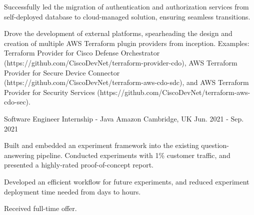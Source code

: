 \begin{cventries}
{\begin{cvitems}
        \item {Successfully led the migration of authentication and authorization services from self-deployed database to cloud-managed solution, ensuring seamless transitions.}
        \item {Drove the development of external platforms, spearheading the design and creation of multiple AWS Terraform plugin providers from inception. Examples: Terraform Provider for Cisco Defense Orchestrator (https://github.com/CiscoDevNet/terraform-provider-cdo), AWS Terraform Provider for Secure Device Connector (https://github.com/CiscoDevNet/terraform-aws-cdo-sdc), and AWS Terraform Provider for Security Services (https://github.com/CiscoDevNet/terraform-aws-cdo-sec).}
    \end{cvitems}
    }

  \cventry
    {Software Engineer Internship - Java} %
    {Amazon} %
    {Cambridge, UK} %
    {Jun. 2021 - Sep. 2021} %
    {
      \begin{cvitems} %
        \item {Built and embedded an experiment framework into the existing question-answering pipeline. Conducted experiments with 1\% customer traffic, and presented a highly-rated proof-of-concept report.}
        \item {Developed an efficient workflow for future experiments, and reduced experiment deployment time needed from days to hours.}
        \item {Received full-time offer.}
      \end{cvitems}
    }


\end{cventries}
